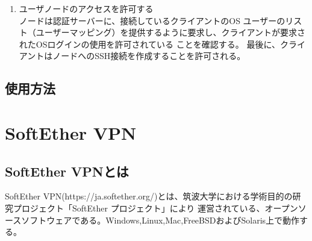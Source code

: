 \documentclass[12pt,a4paper,titlepage]{jreport}
\begin{document}
\begin{enumerate}[1:]
    \item ユーザノードのアクセスを許可する\mbox{}\\ノードは認証サーバーに、接続しているクライアントのOS
    ユーザーのリスト（ユーザーマッピング）を提供するように要求し、クライアントが要求されたOSログインの使用を許可されている
    ことを確認する。
    最後に、クライアントはノードへのSSH接続を作成することを許可される。

\end{enumerate}


\subsection*{使用方法}

\section{SoftEther VPN}

\subsection*{SoftEther VPNとは}

SoftEther VPN(https://ja.softether.org/)とは、筑波大学における学術目的の研究プロジェクト「SoftEther プロジェクト」により
運営されている、オープンソースソフトウェアである。Windows,Linux,Mac,FreeBSDおよびSolaris上で動作する。
\end{document}
